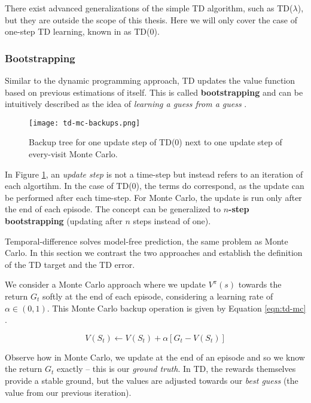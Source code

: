 There exist advanced generalizations of the simple TD algorithm, such as TD($\lambda$), but they are outside the scope of this thesis.
Here we will only cover the case of one-step TD learning, known in \cite{rlai} as TD(0).

\subsubsection{Bootstrapping}
Similar to the dynamic programming approach, TD updates the value function based on previous estimations of itself.
This is called \textbf{bootstrapping} and can be intuitively described as the idea of \emph{learning a guess from a guess} \cite{rlai}.

\begin{figure}[h]
    \texttt{[image: td-mc-backups.png]}
    \centering
    \caption[Caption]{Backup tree for one update step of TD(0) next to one update step of every-visit Monte Carlo.} \label{fig:td-mc-update-steps}
\end{figure}

In Figure \ref{fig:td-mc-update-steps}, an \emph{update step} is not a time-step but instead refers to an iteration of each algortihm.
In the case of TD(0), the terms do correspond, as the update can be performed after each time-step.
For Monte Carlo, the update is run only after the end of each episode.
The concept can be generalized to \textbf{$n$-step bootstrapping} (updating after $n$ steps instead of one).

Temporal-difference solves model-free prediction, the same problem as Monte Carlo.
In this section we contrast the two approaches and establish the definition of the TD target and the TD error.

We consider a Monte Carlo approach where we update $V^{\pi}(s)$ towards the return $G_t$ softly at the end of each episode, considering a learning rate of $\alpha \in (0, 1)$.
This Monte Carlo backup operation is given by Equation \ref{eqn:td-mc} \cite{rlai}.

\begin{equation} \label{eqn:td-mc}
    V(S_t) \leftarrow  V(S_t) + \alpha[G_t - V(S_t)]
\end{equation}

Observe how in Monte Carlo, we update at the end of an episode and so we know the return $G_t$ exactly -- this is our \emph{ground truth}.
In TD, the rewards themselves provide a stable ground, but the values are adjusted towards our \emph{best guess} (the value from our previous iteration).

